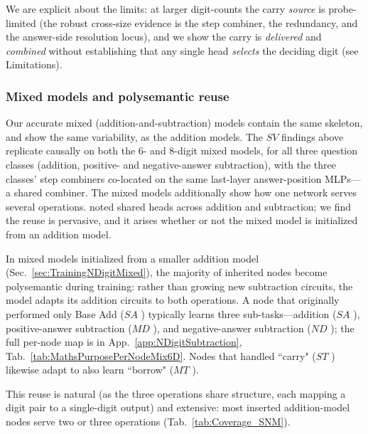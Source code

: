 \documentclass[11pt]{article}
\newcommand{\SA}{$SA$ }
\newcommand{\ST}{$ST$ }
\newcommand{\SV}{$SV$ }
\newcommand{\MD}{$MD$ }
\newcommand{\MT}{$MT$ }
\newcommand{\ND}{$ND$ }
\begin{document}
We are explicit about the limits: at larger digit-counts the carry \emph{source} is probe-limited (the robust cross-size evidence is the
step combiner, the redundancy, and the answer-side resolution locus), and we show the carry is \emph{delivered} and \emph{combined} without
establishing that any single head \emph{selects} the deciding digit (see Limitations).

\subsubsection{Mixed models and polysemantic reuse}
\label{sec:MixedPoly}

Our accurate mixed (addition-and-subtraction) models contain the same skeleton, and show the same variability, as the addition models. 
The \SV findings above replicate causally on both the 6- and 8-digit mixed models, for all three question classes (addition, positive- and negative-answer subtraction), 
with the three classes' step combiners co-located on the same last-layer answer-position MLPs---a shared combiner.
The mixed models additionally show how one network serves several operations. \citet{zhang2024interpretingimprovinglargelanguage} noted shared heads 
across addition and subtraction; we find the reuse is pervasive, and it arises whether or not the mixed model is initialized from an addition model.

In mixed models initialized from a smaller addition model (Sec.~\ref{sec:TrainingNDigitMixed}), the majority of inherited nodes become polysemantic during training: 
rather than growing new subtraction circuits, the model adapts its addition circuits to both operations. A node that originally performed only Base Add (\SA) typically 
learns three sub-tasks---addition (\SA), positive-answer subtraction (\MD), and negative-answer subtraction (\ND); the full per-node map is in App.~\ref{app:NDigitSubtraction}, 
Tab.~\ref{tab:MathsPurposePerNodeMix6D}. Nodes that handled ``carry" (\ST) likewise adapt to also learn ``borrow" (\MT).

This reuse is natural (as the three operations share structure, each mapping a digit pair to a single-digit output) and extensive: most inserted addition-model nodes 
serve two or three operations (Tab.~\ref{tab:Coverage_SNM}).
\end{document}
